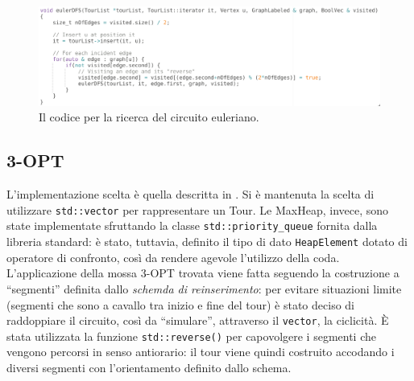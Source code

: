 \begin{figure}[H]
    \centering
    \includegraphics[width=450pt]{img/eulerDFS.png}
    \caption{Il codice per la ricerca del circuito euleriano.}
\end{figure}

\subsection{3-OPT}

L'implementazione scelta è quella descritta in \cite{3opt}. Si è mantenuta la scelta di utilizzare 
\texttt{std::vector} per rappresentare un Tour. Le MaxHeap, invece, sono state implementate sfruttando 
la classe \texttt{std::priority\_queue} fornita dalla libreria standard: è stato, tuttavia, definito il 
tipo di dato \texttt{HeapElement} dotato di operatore di confronto, così da rendere agevole l'utilizzo 
della coda. L'applicazione della mossa 3-OPT trovata viene fatta seguendo la costruzione a ``segmenti'' 
definita dallo \textit{schemda di reinserimento}: per evitare situazioni limite (segmenti che sono a cavallo 
tra inizio e fine del tour) è stato deciso di raddoppiare il circuito, così da ``simulare'', attraverso il 
\texttt{vector}, la ciclicità. È stata utilizzata la funzione \texttt{std::reverse()} per capovolgere i 
segmenti che vengono percorsi in senso antiorario: il tour viene quindi costruito accodando i diversi 
segmenti con l'orientamento definito dallo schema.
\ \\

